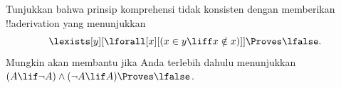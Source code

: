 \documentclass[../../../include/open-logic-section]{subfiles}
\begin{document}
\begin{prob}
Tunjukkan bahwa prinsip komprehensi tidak konsisten dengan memberikan
!!a{derivation} yang menunjukkan
\[
\lexists[y][\lforall[x][(x \in y \liff x \notin x)]] \Proves \lfalse.
\]
Mungkin akan membantu jika Anda terlebih dahulu menunjukkan
$(A \lif \lnot A) \land (\lnot A \lif A) \Proves \lfalse$.
\end{prob}
\end{document}
